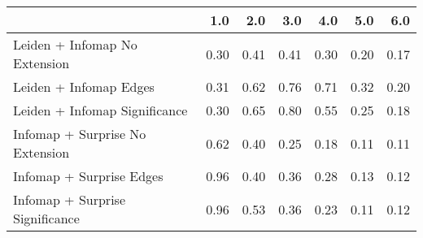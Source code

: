 \begin{tabular}{lrrrrrr}
\toprule
{} &  1.0 &  2.0 &  3.0 &  4.0 &  5.0 &  6.0 \\
\midrule
Leiden + Infomap No Extension   & 0.30 & 0.41 & 0.41 & 0.30 & 0.20 & 0.17 \\
Leiden + Infomap Edges          & 0.31 & 0.62 & 0.76 & 0.71 & 0.32 & 0.20 \\
Leiden + Infomap Significance   & 0.30 & 0.65 & 0.80 & 0.55 & 0.25 & 0.18 \\
Infomap + Surprise No Extension & 0.62 & 0.40 & 0.25 & 0.18 & 0.11 & 0.11 \\
Infomap + Surprise Edges        & 0.96 & 0.40 & 0.36 & 0.28 & 0.13 & 0.12 \\
Infomap + Surprise Significance & 0.96 & 0.53 & 0.36 & 0.23 & 0.11 & 0.12 \\
\bottomrule
\end{tabular}
